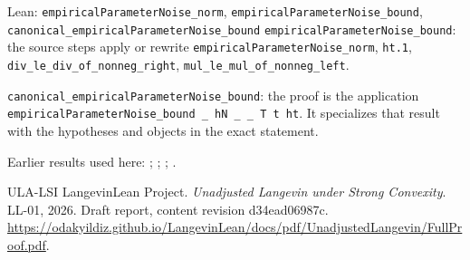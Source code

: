 \documentclass[11pt,a4paper]{article}
\begin{document}
\begin{leanbox}{Lean: \texttt{empiricalParameterNoise\_\allowbreak{}norm}, \texttt{empiricalParameterNoise\_\allowbreak{}bound}, \texttt{canonical\_\allowbreak{}empiricalParameterNoise\_\allowbreak{}bound}}
\texttt{empirical\allowbreak{}Parameter\allowbreak{}Noise\_\allowbreak{}bound}: the source steps apply or rewrite \texttt{empirical\allowbreak{}Parameter\allowbreak{}Noise\_\allowbreak{}norm}, \texttt{ht.\allowbreak{}1}, \texttt{div\_\allowbreak{}le\_\allowbreak{}div\_\allowbreak{}of\_\allowbreak{}nonneg\_\allowbreak{}right}, \texttt{mul\_\allowbreak{}le\_\allowbreak{}mul\_\allowbreak{}of\_\allowbreak{}nonneg\_\allowbreak{}left}.



\texttt{canonical\_\allowbreak{}empirical\allowbreak{}Parameter\allowbreak{}Noise\_\allowbreak{}bound}: the proof is the application \texttt{empirical\allowbreak{}Parameter\allowbreak{}Noise\_\allowbreak{}bound \_\allowbreak{} h\allowbreak{}N \_\allowbreak{} \_\allowbreak{} T t ht}. It specializes that result with the hypotheses and objects in the exact statement.
\end{leanbox}


Earlier results used here: \cite[Section~3.25.4]{LangevinLean2026ULASC}; \cite[Section~3.8.17]{LangevinLean2026ULASC}; \cite[Section~3.8.19]{LangevinLean2026ULASC}; \cite[Section~3.8.20]{LangevinLean2026ULASC}.

\begin{thebibliography}{ULA-LSI}
LangevinLean Project. \emph{Unadjusted Langevin under Strong Convexity}. LL-01, 2026. Draft report, content revision d34ead06987c. \url{https://odakyildiz.github.io/LangevinLean/docs/pdf/UnadjustedLangevin/FullProof.pdf}.
\end{thebibliography}
\end{document}
